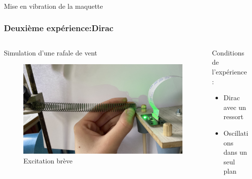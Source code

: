 \documentclass{beamer}
\begin{document}
	
	\begin{frame}{Mise en vibration de la maquette}
		\frametitle{Deuxième expérience:Dirac}
		\subtitle{bjr}
		\begin{columns}
			\begin{column}{0.5\textwidth}
				\alert{Simulation d'une rafale de vent}
				\begin{figure}
					\includegraphics[width=\textwidth]{Image/Montage dirac.jpg}
					\caption{Excitation brève}
				\end{figure}
			\end{column}
			\begin{column}{0.5\textwidth}
				Conditions de l'expérience :
				\begin{itemize}
					\item Dirac avec un ressort 
					\item Oscillations dans un seul plan
				\end{itemize}	
			\end{column}
		\end{columns}
	\end{frame}
	
	
	
\end{document}
